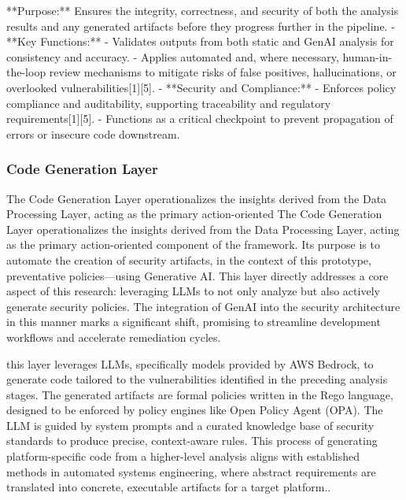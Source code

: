 **Purpose:**  
  Ensures the integrity, correctness, and security of both the analysis results and any generated artifacts before they progress further in the pipeline.
- **Key Functions:**  
  - Validates outputs from both static and GenAI analysis for consistency and accuracy.
  - Applies automated and, where necessary, human-in-the-loop review mechanisms to mitigate risks of false positives, hallucinations, or overlooked vulnerabilities[1][5].
- **Security and Compliance:**  
  - Enforces policy compliance and auditability, supporting traceability and regulatory requirements[1][5].
  - Functions as a critical checkpoint to prevent propagation of errors or insecure code downstream.


\subsubsection{Code Generation Layer} %
\label{sec:Code Generation Laye}

The Code Generation Layer operationalizes the insights derived from the Data Processing Layer, acting as the primary action-oriented The Code Generation Layer operationalizes the insights derived from the Data Processing Layer, acting as the primary action-oriented component of the framework. Its purpose is to automate the creation of security artifacts, in the context of this prototype, preventative policies—using Generative AI. This layer directly addresses a core aspect of this research: leveraging LLMs to not only analyze but also actively generate security policies. The integration of GenAI into the security architecture in this manner marks a significant shift, promising to streamline development workflows and accelerate remediation cycles\cite{kumar_generative_nodate}.

this layer leverages LLMs, specifically models provided by AWS Bedrock, to generate code tailored to the vulnerabilities identified in the preceding analysis stages. The generated artifacts are formal policies written in the Rego language, designed to be enforced by policy engines like Open Policy Agent (OPA). The LLM is guided by system prompts and a curated knowledge base of security standards to produce precise, context-aware rules. This process of generating platform-specific code from a higher-level analysis aligns with established methods in automated systems engineering, where abstract requirements are translated into concrete, executable artifacts for a target platform.\cite{chen_platform-specific_2025}.

